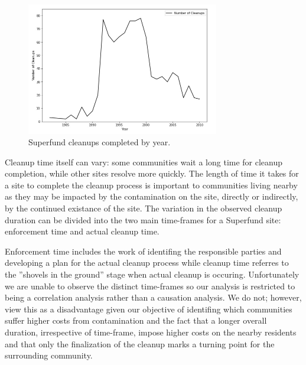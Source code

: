 \documentclass[12pt]{article}
\begin{document}
\begin{figure}[h] \centering
	\includegraphics[width=0.75\textwidth]{figure1_new}
	\caption{Superfund cleanups completed by year.} \label{fig1}
\end{figure}


Cleanup time itself can vary: some communities wait a long time for cleanup completion, while other sites resolve more quickly. The length of time it takes for a site to complete the cleanup process is important to communities living nearby as they may be impacted by the contamination on the site, directly or indirectly, by the continued existance of the site. The variation in the observed cleanup duration can be divided into the two main time-frames for a Superfund site: enforcement time and actual cleanup time.

Enforcement time includes the work of identifing the responsible parties and developing a plan for the actual cleanup process while cleanup time referres to the ''shovels in the ground'' stage when actual cleanup is occuring. Unfortunately we are unable to observe the distinct time-frames so our analysis is restricted to being a correlation analysis rather than a causation analysis. We do not; however, view this as a disadvantage given our objective of identifing which communities suffer higher costs from contamination and the fact that a longer overall duration, irrespective of time-frame, impose higher costs on the nearby residents and that only the finalization of the cleanup marks a turning point for the surrounding community.
\end{document}

